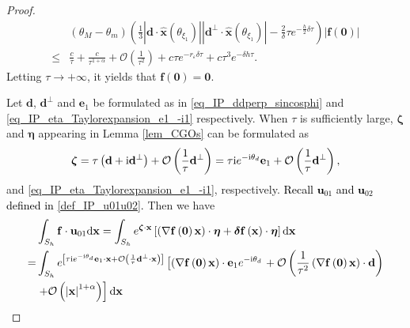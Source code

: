 \documentclass[10pt,a4paper]{amsart}
\begin{document}
\begin{proof}
	\begin{align*} 
		&\left(\theta_M-\theta_m\right)\left(\frac{1}{3 }\left|\mathbf{d}\cdot\hat{\mathbf{x}} \left(\theta_{\xi_1}\right)\right| \left|\mathbf{d}^{\perp}\cdot\hat{\mathbf{x}} \left(\theta_{\xi_1}\right)\right| - \frac{2}{\delta}\tau e^{-\frac{h}{2} \delta \tau}\right) \left| \mathbf{f}\left(\bm{0}\right) \right| \\
		\leqslant &\frac{c}{\tau} +  \frac{c}{\tau^{1+\alpha}} + \mathcal{O}\left(\frac{1}{\tau^2}\right) + c\tau e^{-r_{\varepsilon} \delta \tau} + c \tau^3 e^{- \delta h \tau} .
	\end{align*}
	Letting $ \tau\to+\infty $, it yields that $ \mathbf{f} \left(\bm{0}\right) = \bm{0} $.
	
	Let $ \mathbf{d} $, $ \mathbf{d}^{\perp} $ and $ \mathbf{e}_1 $ be formulated as in \eqref{eq_IP_ddperp_sincosphi} and \eqref{eq_IP_eta_Taylorexpansion_e1_-i1} respectively. When $ \tau $ is sufficiently large, $ \bm{\zeta} $ and $ \bm{\eta} $ appearing in Lemma \ref{lem_CGOs} can be formulated as
	\begin{align}
		\bm{\zeta} = \tau \left( \mathbf{d} + \text{i} \mathbf{d}^{\perp} \right) + \mathcal{O} \left(\frac{1}{\tau}\mathbf{d}^{\perp}\right) = \tau \mathrm{i} e^{-\mathrm{i}\theta_d} \mathbf{e}_1  + \mathcal{O} \left(\frac{1}{\tau}\mathbf{d}^{\perp}\right), \notag
	\end{align}
	and \eqref{eq_IP_eta_Taylorexpansion_e1_-i1}, respectively. \textcolor{black}{Recall $\mathbf{u}_{01}$ and $\mathbf{u}_{02}$ defined in \eqref{def_IP_u01u02}.} Then we have
	\begin{align} \label{eq_intSh_fu01}
		& \int_{S_h} \mathbf{f} \cdot \mathbf{u}_{01} \mathrm{d}\mathbf{x} = \int_{S_h} e^{\bm{\zeta} \cdot \mathbf{x}} \left[\left(\nabla \mathbf{f} \left(\bm{0}\right) \mathbf{x}\right)\cdot\bm{\eta} + \bm{\delta} \mathbf{f}\left(\mathbf{x}\right)\cdot \bm{\eta}\right] \mathrm{d}\mathbf{x} \notag \\
		= & \int_{S_h} e^{\left[\tau \mathrm{i} e^{-\mathrm{i}\theta_d} \mathbf{e}_1 \cdot \mathbf{x} + \mathcal{O} \left(\frac{1}{\tau}\mathbf{d}^{\perp} \cdot \mathbf{x}\right)\right]}\left[ \left(\nabla \mathbf{f} \left(\bm{0}\right) \mathbf{x}\right)\cdot\mathbf{e}_1 e^{-\mathrm{i}\theta_d}\right. + \mathcal{O} \left(\frac{1}{\tau^2}\left(\nabla \mathbf{f} \left(\bm{0}\right) \mathbf{x}\right)\cdot\mathbf{d}\right)\notag \\
		& \left. + \mathcal{O}\left(\left|\mathbf{x}\right|^{1+\alpha}\right)\right] \mathrm{d}\mathbf{x} \notag \\

\end{align}
\end{proof}
\end{document}
